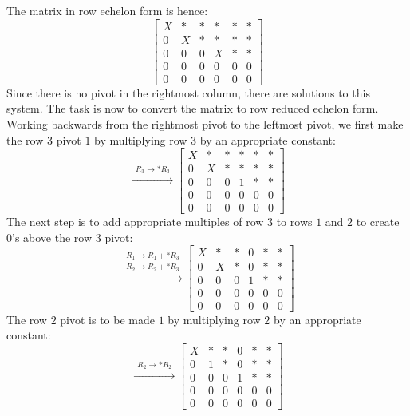 \documentclass{article}
\begin{document}
The matrix in row echelon form is hence:
\[\left[\begin{array}{ccccc|c}
X & * & * & * & * & * \\
0 & X & * & * & * & * \\
0 & 0 & 0 & X & * & * \\
0 & 0 & 0 & 0 & 0 & 0 \\
0 & 0 & 0 & 0 & 0 & 0 
\end{array}\right]\]
Since there is no pivot in the rightmost column, there are solutions to this system. The task is now to convert the matrix to row reduced echelon form. Working backwards from the rightmost pivot to the leftmost pivot, we first make the row \(3\) pivot \(1\) by multiplying row \(3\) by an appropriate constant:
\[\xrightarrow{\begin{array}{c} R_3 \rightarrow *R_3 \end{array}} \left[\begin{array}{ccccc|c}
X & * & * & * & * & * \\
0 & X & * & * & * & * \\
0 & 0 & 0 & 1 & * & * \\
0 & 0 & 0 & 0 & 0 & 0 \\
0 & 0 & 0 & 0 & 0 & 0 
\end{array}\right]\]
The next step is to add appropriate multiples of row \(3\) to rows \(1\) and \(2\) to create \(0\)'s above the row \(3\) pivot:
\[\xrightarrow{\begin{array}{c} R_1 \rightarrow R_1 + *R_3 \\ R_2 \rightarrow R_2 + *R_3 \end{array}} \left[\begin{array}{ccccc|c}
X & * & * & 0 & * & * \\
0 & X & * & 0 & * & * \\
0 & 0 & 0 & 1 & * & * \\
0 & 0 & 0 & 0 & 0 & 0 \\
0 & 0 & 0 & 0 & 0 & 0 
\end{array}\right]\]
The row \(2\) pivot is to be made \(1\) by multiplying row \(2\) by an appropriate constant: 
\[\xrightarrow{\begin{array}{c} R_2 \rightarrow *R_2 \end{array}} \left[\begin{array}{ccccc|c}
X & * & * & 0 & * & * \\
0 & 1 & * & 0 & * & * \\
0 & 0 & 0 & 1 & * & * \\
0 & 0 & 0 & 0 & 0 & 0 \\
0 & 0 & 0 & 0 & 0 & 0 
\end{array}\right]\]
\end{document}
